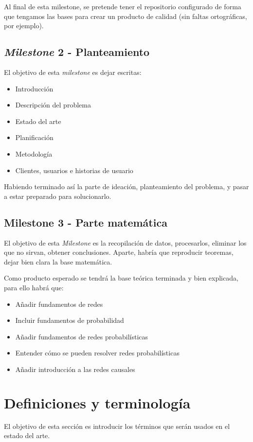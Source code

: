 Al final de esta milestone, se pretende tener el repositorio configurado de forma que tengamos las 
bases para crear un producto de calidad (sin faltas ortográficas, por ejemplo).

\subsection{\textit{Milestone} 2 - Planteamiento}
El objetivo de esta \textit{milestone} es dejar escritas:

\begin{itemize}
    \item Introducción
    \item Descripción del problema
    \item Estado del arte
    \item Planificación
    \item Metodología
    \item Clientes, usuarios e historias de usuario
\end{itemize}

Habiendo terminado así la parte de ideación, planteamiento del problema, y pasar a estar preparado para solucionarlo.

\subsection{Milestone 3 - Parte matemática} 
El objetivo de esta \textit{Milestone} es la recopilación de datos, procesarlos, eliminar los que 
no sirvan, obtener conclusiones. Aparte, habría que reproducir teoremas, dejar bien clara la base matemática.

Como producto esperado se tendrá la base teórica terminada y bien explicada, para ello habrá que: 

\begin{itemize}
    \item Añadir fundamentos de redes
    \item Incluir fundamentos de probabilidad 
    \item Añadir fundamentos de redes probabilísticas 
    \item Entender cómo se pueden resolver redes probabilísticas 
    \item Añadir introducción a las redes causales 
\end{itemize}

\section{Definiciones y terminología}
El objetivo de esta sección es introducir los términos que serán usados en el estado del arte.

